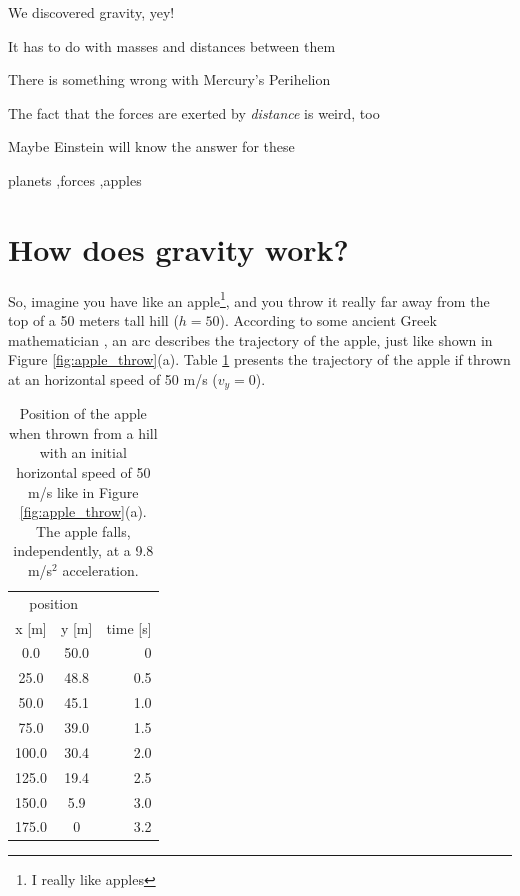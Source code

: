 \documentclass[preprint,12pt]{elsarticle}
\begin{document}
\begin{frontmatter}
\begin{highlights}
\item We discovered gravity, yey!
\item It has to do with masses and distances between them
\item There is something wrong with Mercury's Perihelion
\item The fact that the forces are exerted by \emph{distance} is weird, too
\item Maybe Einstein will know the answer for these
\end{highlights}

\begin{keyword}
planets \sep forces \sep apples
\end{keyword}

\end{frontmatter}


\section{How does gravity work?}\label{s:introduction}
\label{sec:sample1}
So, imagine you have like an apple\footnote{I really like apples}, and you throw it really far away from the top of a 50 meters tall hill ($h=50$). According to some ancient Greek mathematician \cite{roller2010eratosthenes}, an arc describes the trajectory of the apple, just like shown in Figure \ref{fig:apple_throw}(a). Table \ref{tab:projectile} presents the trajectory of the apple if thrown at an horizontal speed of 50 m/s ($v_y=0$).

\begin{table}
    \centering
    \caption{Position of the apple when thrown from a hill with an initial horizontal speed of 50 m/s like in Figure \ref{fig:apple_throw}(a). The apple falls, independently, at a 9.8 m/s$^2$ acceleration.}
    \label{tab:projectile}
    \begin{tabular}{c c | r}
    \hline
    \multicolumn{2}{c}{position} & \\
    x [m] & y [m] & time [s] \\
    \hline
    0.0 & 50.0 & 0 \\
    25.0&48.8 & 0.5\\
    50.0&45.1 & 1.0 \\
    75.0&39.0 & 1.5 \\
    100.0&30.4 & 2.0 \\
    125.0&19.4 & 2.5 \\
    150.0&5.9 & 3.0 \\
    175.0&0 & 3.2 \\
    \hline
    \end{tabular}
\end{table}
\end{document}

